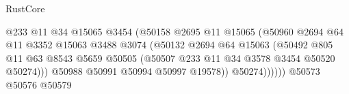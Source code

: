 \begin{lexlean}{RustCore}
\begin{coremodule}
                                                @233
                                                @11
                                                @34
                                                @15065
                                                @3454
                                                (@50158
                                                  @2695
                                                  @11
                                                  @15065
                                                  (@50960
                                                    @2694
                                                    @64
                                                    @11
                                                    @3352
                                                    @15063
                                                    @3488
                                                    @3074
                                                    (@50132
                                                      @2694
                                                      @64
                                                      @15063
                                                      (@50492
                                                        @805
                                                        @11
                                                        @63
                                                        @8543
                                                        @5659
                                                        @50505
                                                        (@50507
                                                          @233
                                                          @11
                                                          @34
                                                          @3578
                                                          @3454
                                                          @50520
                                                          @50274)))
                                                    @50988
                                                    @50991
                                                    @50994
                                                    @50997
                                                    @19578))
                                                @50274))))))
                                    @50573
                                    @50576
                                    @50579

\end{coremodule}
\end{lexlean}
